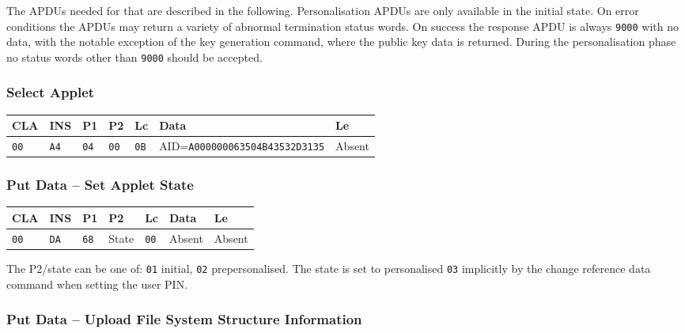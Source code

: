 \documentclass{article}
\begin{document}
The APDUs needed for that are described in the following.
Personalisation APDUs are only available in the \textsf{initial}
state.  On error conditions the APDUs may return a variety of abnormal
termination status words. On success the response APDU is always
\texttt{9000} with no data, with the notable exception of the key 
generation command, where the public key data is returned.
During the personalisation phase no status
words other than \texttt{9000} should be accepted.

\subsubsection{Select Applet}\label{sec:selectaid}

\begin{flushleft}
\begin{tabular}{|l|l|l|l|l|l|l|}
\hline
CLA & INS & P1 & P2 & Lc & Data & Le \\
\hline
\texttt{00} & \texttt{A4} & \texttt{04} & \texttt{00} &
\texttt{0B} & AID=\texttt{A000000063504B43532D3135} & Absent \\
\hline
\end{tabular}
\end{flushleft}


\subsubsection{Put Data -- Set Applet State}

\begin{flushleft}
\begin{tabular}{|l|l|l|l|l|l|l|}
\hline
CLA & INS & P1 & P2 & Lc & Data & Le \\
\hline
\texttt{00} & \texttt{DA} & \texttt{68} & State &
\texttt{00} & Absent & Absent \\
\hline
\end{tabular}
\end{flushleft}
The P2/state can be one of: \texttt{01} initial, \texttt{02}
prepersonalised. The state is set to personalised \texttt{03}
implicitly by the change reference data command when setting the user
PIN.

\subsubsection{Put Data -- Upload File System Structure Information}
\end{document}
